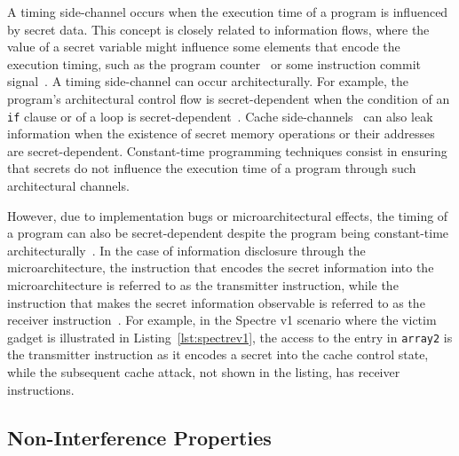 A timing side-channel occurs when the execution time of a program is influenced by secret data.
This concept is closely related to information flows, where the value of a secret variable might influence some elements that encode the execution timing, such as the program counter~\cite{ceesay2024mucfi} or some instruction commit signal~\cite{tan2025contractshadowlogic,dinesh2024conjunct,dinesh2025h}.
A timing side-channel can occur architecturally.
For example, the program's architectural control flow is secret-dependent when the condition of an \texttt{if} clause or of a loop is secret-dependent~\cite{kocher1996timing}.
Cache side-channels~\cite{bonneau2006cache,bernstein2005cache} can also leak information when the existence of secret memory operations or their addresses are secret-dependent.
Constant-time programming techniques consist in ensuring that secrets do not influence the execution time of a program through such architectural channels.

However, due to implementation bugs or microarchitectural effects, the timing of a program can also be secret-dependent despite the program being constant-time architecturally~\cite{kocher2019spectre,lipp2018meltdown,armsecure,bhattacharyya2019smotherspectre,van2018foreshadow,canella2019fallout,horn2018speculative,maisuradze2018ret2spec,schwarz2019zombieload,schwarz2019netspectre,stecklina2018lazyfp,van2019ridl,ragab2021crosstalk,van2020lvi,van2021cacheout,ragab2021rage}.
In the case of information disclosure through the microarchitecture, the instruction that encodes the secret information into the microarchitecture is referred to as the transmitter instruction, while the instruction that makes the secret information observable is referred to as the receiver instruction~\cite{kiriansky2018dawg}.
For example, in the Spectre v1 scenario where the victim gadget is illustrated in Listing~\ref{lst:spectrev1}, the access to the entry in \texttt{array2} is the transmitter instruction as it encodes a secret into the cache control state, while the subsequent cache attack, not shown in the listing, has receiver instructions.

\subsection{Non-Interference Properties}
\label{subsec:non-interference}

